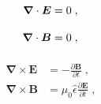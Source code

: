 \noindent\begin{minipage}{.5\linewidth}
\begin{align}
    \bm{\nabla}\cdot \bm{E} &=0\;,\label{eq:maxwell1reduced}
    \vphantom{\frac{\partial\bm{B}}{\partial t}}\\
    \bm{\nabla}\cdot\bm{B} &=0\;,\vphantom{\frac{\partial\bm{B}}{\partial t}}\label{eq:maxwell2reduced}
\end{align}
\end{minipage}%
\begin{minipage}{.5\linewidth}
\begin{align}
    \bm{\nabla}\times\bm{E} &=-\frac{\partial\bm{B}}{\partial t}\;,\label{eq:maxwell3reduced}
    \\
    \bm{\nabla}\times\bm{B} &=\mu_0 \hat{\epsilon} \frac{\partial\bm{E}}{\partial t}\;,\label{eq:maxwell4reduced}
\end{align}
\end{minipage}
\newline

